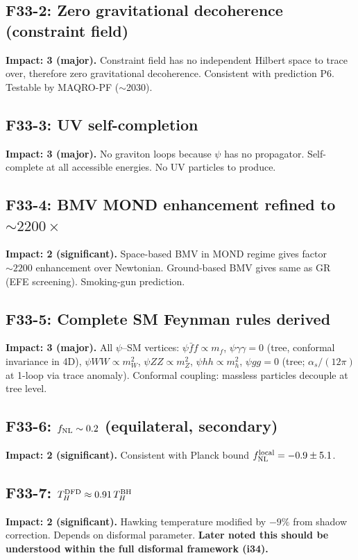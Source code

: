 \documentclass[11pt,a4paper]{article}
\begin{document}
\subsection{F33-2: Zero gravitational decoherence (constraint field)}
\textbf{Impact: 3 (major).} Constraint field has no independent Hilbert space to trace over, therefore zero gravitational decoherence. Consistent with prediction P6. Testable by MAQRO-PF ($\sim$2030).

\subsection{F33-3: UV self-completion}
\textbf{Impact: 3 (major).} No graviton loops because $\psi$ has no propagator. Self-complete at all accessible energies. No UV particles to produce.

\subsection{F33-4: BMV MOND enhancement refined to $\sim 2200\times$}
\textbf{Impact: 2 (significant).} Space-based BMV in MOND regime gives factor $\sim 2200$ enhancement over Newtonian. Ground-based BMV gives same as GR (EFE screening). Smoking-gun prediction.

\subsection{F33-5: Complete SM Feynman rules derived}
\textbf{Impact: 3 (major).} All $\psi$--SM vertices: $\psi\bar{f}f \propto m_f$, $\psi\gamma\gamma = 0$ (tree, conformal invariance in 4D), $\psi WW \propto m_W^2$, $\psi ZZ \propto m_Z^2$, $\psi hh \propto m_h^2$, $\psi gg = 0$ (tree; $\alpha_s/(12\pi)$ at 1-loop via trace anomaly). Conformal coupling: massless particles decouple at tree level.

\subsection{F33-6: $f_{\rm NL} \sim 0.2$ (equilateral, secondary)}
\textbf{Impact: 2 (significant).} Consistent with Planck bound $f_{\rm NL}^{\rm local} = -0.9 \pm 5.1$.

\subsection{F33-7: $T_H^{\rm DFD} \approx 0.91\,T_H^{\rm BH}$}
\textbf{Impact: 2 (significant).} Hawking temperature modified by $-9\%$ from shadow correction. Depends on disformal parameter. \textbf{Later noted this should be understood within the full disformal framework (i34).}
\end{document}
